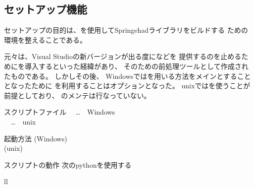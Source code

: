
\subsection{セットアップ機能}
\label{subsec:Setup}

セットアップの目的は、を使用してSpringehadライブラリをビルドする
ための環境を整えることである。
\begin{narrow}{\small
	元々は、Visual Studioの新バージョンが出る度になどを
	提供するのを止めるためにを導入するといった経緯があり、
	そのための前処理ツールとして作成されたものである。
	しかしその後、
	Windowsではを用いる方法をメインとすることとなったために
	を利用することはオプションとなった。
	unixではを使うことが前提としており、
	のメンテは行なっていない。
	
}\end{narrow}

\medskip
\begin{Description}{スクリプトファイル}
	　…　{\small Windows}\\
	　…　{\small unix}
\end{Description}

\medskip
\begin{Description}{起動方法}
	 \Hskip{10pt}(Windows)\\
	 \Hskip{10pt}(unix)

	\begin{Opts}
	\end{Opts}
\end{Description}

\medskip
\begin{Description}{スクリプトの動作}
    次のpythonを使用する
    \begin{Table}[r][60pt]{ll}
    \end{Table}
\end{Description}

